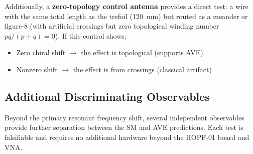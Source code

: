 Additionally, a \textbf{zero-topology control antenna} provides a direct test: a wire with the same total length as the trefoil (120~mm) but routed as a meander or figure-8 (with artificial crossings but zero topological winding number $pq/(p{+}q) = 0$). If this control shows:
\begin{itemize}
    \item Zero chiral shift $\rightarrow$ the effect is topological (supports AVE)
    \item Nonzero shift $\rightarrow$ the effect is from crossings (classical artifact)
\end{itemize}
\subsection{Additional Discriminating Observables}

Beyond the primary resonant frequency shift, several independent observables provide further separation between the SM and AVE predictions. Each test is falsifiable and requires no additional hardware beyond the HOPF-01 board and VNA.


